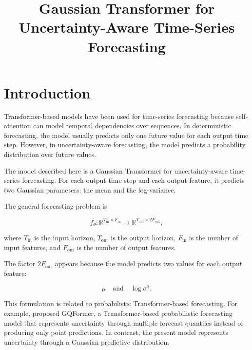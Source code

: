 \documentclass[a4paper]{article}
\title{Gaussian Transformer for Uncertainty-Aware Time-Series Forecasting}
\date{}
\begin{document}
    \maketitle
    
    
    \section{Introduction}
        
        Transformer-based models have been used for time-series forecasting because self-attention can model temporal dependencies over sequences. In deterministic forecasting, the model usually predicts only one future value for each output time step. However, in uncertainty-aware forecasting, the model predicts a probability distribution over future values.
        
        The model described here is a Gaussian Transformer for uncertainty-aware time-series forecasting. For each output time step and each output feature, it predicts two Gaussian parameters: the mean and the log-variance.
        
        The general forecasting problem is
        
        \[
            f_{\theta}:
            \mathbb{R}^{T_{\mathrm{in}} \times F_{\mathrm{in}}}
            \rightarrow
            \mathbb{R}^{T_{\mathrm{out}} \times 2F_{\mathrm{out}}},
        \]
        
        where \(T_{\mathrm{in}}\) is the input horizon, \(T_{\mathrm{out}}\) is the output horizon, \(F_{\mathrm{in}}\) is the number of input features, and \(F_{\mathrm{out}}\) is the number of output features.
        
        The factor \(2F_{\mathrm{out}}\) appears because the model predicts two values for each output feature:
        
        \[
            \mu
            \quad
            \text{and}
            \quad
            \log \sigma^2.
        \]
        
        This formulation is related to probabilistic Transformer-based forecasting. For example, \cite{jawed-2022-gqformer-a-multi-quantile-generative-transformer-for-time-series-forecasting} proposed GQFormer, a Transformer-based probabilistic forecasting model that represents uncertainty through multiple forecast quantiles instead of producing only point predictions. In contrast, the present model represents uncertainty through a Gaussian predictive distribution.
    
    
\end{document}
